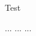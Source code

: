 \documentclass{article}
\begin{document}
Test
\newpage

...
... %
...    
\restoregeometry     %
\end{document}

